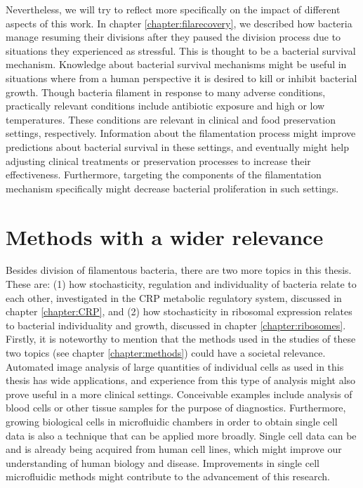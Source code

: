 Nevertheless, we will try to reflect more specifically on the impact of different aspects of this work.
%
In chapter \ref{chapter:filarecovery}, we described how bacteria manage resuming their divisions after they 
paused the division process due to situations they experienced as stressful.
%
This is thought to be a bacterial survival mechanism.
%
Knowledge about bacterial survival mechanisms might be useful in situations 
where from a human perspective it is desired to kill or inhibit bacterial growth.
%
Though bacteria filament in response to many adverse conditions, 
practically relevant conditions include antibiotic exposure and high or low temperatures.
%
These conditions are relevant in clinical and food preservation settings, respectively.
%
Information about the filamentation process might improve predictions about bacterial survival in these settings,
and eventually might help adjusting clinical treatments or preservation processes to increase their effectiveness.
%
Furthermore, targeting the components of the filamentation mechanism specifically might 
decrease bacterial proliferation in %
such settings.

\section{Methods with a wider relevance}

Besides 
division of filamentous bacteria, there are two more topics in this thesis.
These are: 
(1) how stochasticity, regulation and individuality of bacteria relate to each other, investigated in the CRP metabolic regulatory system, discussed in chapter \ref{chapter:CRP},
and (2) how stochasticity in ribosomal expression relates to bacterial individuality and growth, discussed in chapter \ref{chapter:ribosomes}.
%
%
Firstly, 
it is noteworthy to mention that the methods used in the studies of these two topics (see chapter \ref{chapter:methods})
could have a societal relevance. 
%
Automated image analysis of large quantities of individual cells as used in this thesis has wide applications, %
and experience from this type of analysis might also prove useful in a more clinical settings.
%
Conceivable examples include analysis of blood cells or other tissue samples for the purpose of diagnostics.
%
Furthermore, growing biological cells in microfluidic chambers in order to obtain single cell data is also a technique that can be applied more broadly.
%
Single cell data can be and is already being acquired from human cell lines, 
which might improve our understanding of human biology and disease.
%
Improvements in single cell microfluidic methods might contribute to the advancement of this research.

